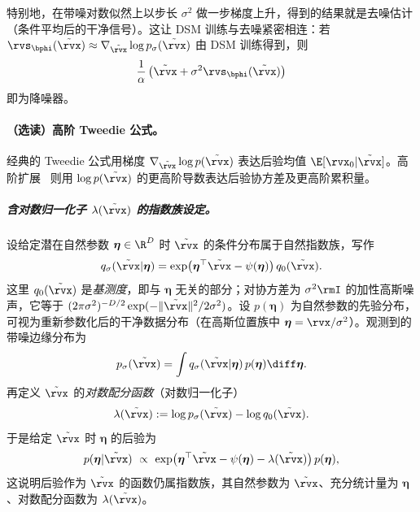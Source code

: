 特别地，在带噪对数似然上以步长 $\sigma^2$ 做一步梯度上升，得到的结果就是去噪估计（条件平均后的干净信号）。这让 DSM 训练与去噪紧密相连：若 $\rvs_\bphi(\tilde{\rvx})\approx
\nabla_{\tilde{\rvx}}\log p_\sigma(\tilde{\rvx})$ 由 DSM 训练得到，则
\[
\frac{1}{\alpha}\left(\tilde{\rvx}+\sigma^2 \rvs_\bphi(\tilde{\rvx})\right)
\]
即为降噪器。

\paragraph{（选读）高阶 Tweedie 公式。} 经典的 Tweedie 公式用梯度 $\nabla_{\tilde{\rvx}}\log p(\tilde{\rvx})$ 表达后验均值 $\E[\rvx_0|\tilde{\rvx}]$。高阶扩展~\citep{meng2021estimating} 则用 $\log p(\tilde{\rvx})$ 的更高阶导数表达后验协方差及更高阶累积量。

\subparagraph{含对数归一化子 $\lambda(\tilde{\rvx})$ 的指数族设定。}
设给定潜在自然参数 $\boldsymbol\eta\in\R^D$ 时 $\tilde{\rvx}$ 的条件分布属于自然指数族，写作
\[
q_\sigma(\tilde{\rvx}|\boldsymbol\eta)
=\exp\!\big(\boldsymbol\eta^\top \tilde{\rvx}-\psi(\boldsymbol\eta)\big)\,q_0(\tilde{\rvx}).
\]
这里 $q_0(\tilde{\rvx})$ 是\emph{基测度}，即与 $\boldsymbol\eta$ 无关的部分；对协方差为 $\sigma^2\rmI$ 的加性高斯噪声，它等于 $(2\pi\sigma^2)^{-D/2}\exp(-\|\tilde{\rvx}\|^2/2\sigma^2)$。设 $p(\boldsymbol\eta)$ 为自然参数的先验分布，可视为重新参数化后的干净数据分布（在高斯位置族中 $\boldsymbol\eta=\rvx/\sigma^2$）。观测到的带噪边缘分布为
\[
p_\sigma(\tilde{\rvx})=\int q_\sigma(\tilde{\rvx}|\boldsymbol\eta)\,p(\boldsymbol\eta)\diff\boldsymbol\eta.
\]
再定义 $\tilde{\rvx}$ 的\emph{对数配分函数}（对数归一化子）
\[
\lambda(\tilde{\rvx}) := \log p_\sigma(\tilde{\rvx})-\log q_0(\tilde{\rvx}).
\]
于是给定 $\tilde{\rvx}$ 时 $\boldsymbol\eta$ 的后验为
\[
p(\boldsymbol\eta|\tilde{\rvx})
\ \propto\
\exp\!\big(\boldsymbol\eta^\top \tilde{\rvx}-\psi(\boldsymbol\eta)-\lambda(\tilde{\rvx})\big)\,p(\boldsymbol\eta),
\]
这说明后验作为 $\tilde{\rvx}$ 的函数仍属指数族，其自然参数为 $\tilde{\rvx}$、充分统计量为 $\boldsymbol\eta$、对数配分函数为 $\lambda(\tilde{\rvx})$。

